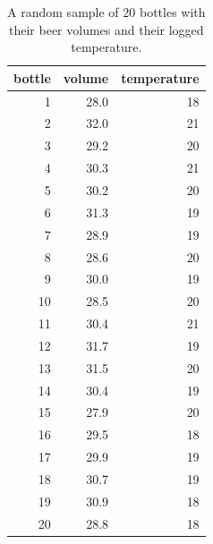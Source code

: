 \documentclass[]{book}\usepackage[]{graphicx}\usepackage[]{color}
\begin{document}
\begin{table}[ht]
\centering
\caption{A random sample of 20 bottles with their beer volumes and their logged temperature.} 
\label{tab:samplesize20}
\begin{tabular}{rrr}
  \hline
bottle & volume & temperature \\ 
  \hline
 1 & 28.0 & 18 \\ 
   2 & 32.0 & 21 \\ 
   3 & 29.2 & 20 \\ 
   4 & 30.3 & 21 \\ 
   5 & 30.2 & 20 \\ 
   6 & 31.3 & 19 \\ 
   7 & 28.9 & 19 \\ 
   8 & 28.6 & 20 \\ 
   9 & 30.0 & 19 \\ 
  10 & 28.5 & 20 \\ 
  11 & 30.4 & 21 \\ 
  12 & 31.7 & 19 \\ 
  13 & 31.5 & 20 \\ 
  14 & 30.4 & 19 \\ 
  15 & 27.9 & 20 \\ 
  16 & 29.5 & 18 \\ 
  17 & 29.9 & 19 \\ 
  18 & 30.7 & 19 \\ 
  19 & 30.9 & 18 \\ 
  20 & 28.8 & 18 \\ 
   \hline
\end{tabular}
\end{table}
\end{document}
